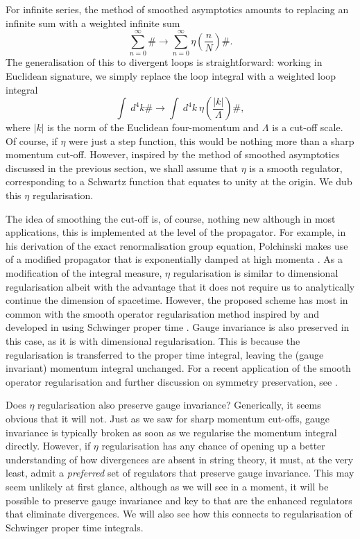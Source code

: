 \documentclass[11pt, letter]{article}
\def\be{\begin{equation}}
\def\ee{\end{equation}}
\begin{document}
For infinite series, the method of smoothed asymptotics amounts to replacing an infinite sum with a weighted infinite sum 
\be
\sum_{n=0}^\infty \# \rightarrow \sum_{n=0}^\infty \eta\left(\frac{n}{N} \right) \# .
\ee
The generalisation of this to divergent loops is straightforward: working in Euclidean signature, we simply replace the loop integral with a weighted loop integral
\begin{equation}
\int \ d^4k \# \rightarrow \int \ d^4k \   \eta \left(\frac{|k|}{\Lambda}\right) \# ,
\end{equation} 
where $|k|$ is the norm of the Euclidean four-momentum and $\Lambda$ is  a cut-off scale. Of course, if $\eta$ were just a step function, this would be nothing more than a sharp momentum cut-off. However, inspired by the method of smoothed asymptotics discussed in the previous section, we shall assume that $\eta$ is a smooth regulator, corresponding to a Schwartz function that equates to unity at the origin.  We dub this $\eta$ regularisation. 

The idea of smoothing the cut-off is, of course, nothing new although in most applications, this is implemented at the level of the propagator.  For example, in his derivation of the exact renormalisation group equation,  Polchinski makes use of a modified propagator that is exponentially damped at high momenta \citep{Polchinski84}.  As a modification of the integral measure,  $\eta$ regularisation is similar to dimensional regularisation albeit with the advantage that it does not require us to analytically continue the dimension of spacetime.  However, the proposed scheme has most in common with  the smooth operator regularisation method inspired by \cite{Ball88} and developed in \cite{Oleszczuk94,Liao96} using Schwinger proper time \cite{SchwingerPT}.  Gauge invariance is also preserved in this case, as it is with dimensional regularisation. This is because the regularisation is transferred to the proper time integral, leaving the (gauge invariant) momentum integral  unchanged.  For a recent application of the smooth operator regularisation and further discussion on symmetry preservation, see \cite{Xing:2022jtt}.


Does $\eta$ regularisation also preserve gauge invariance? Generically, it seems obvious that it will not.  Just as we saw for sharp momentum cut-offs, gauge invariance is typically broken as soon as we regularise the momentum integral directly.  However, if $\eta$ regularisation has any chance of opening up a better understanding of how divergences are absent in string theory, it must, at the very least,  admit a {\it preferred} set of regulators that preserve gauge invariance.  This may seem unlikely at first glance, although as we will see in a moment, it will be possible to preserve gauge invariance and key to that are the enhanced regulators that eliminate divergences.  We will also see how this connects to regularisation of Schwinger proper time integrals. 
\end{document}
